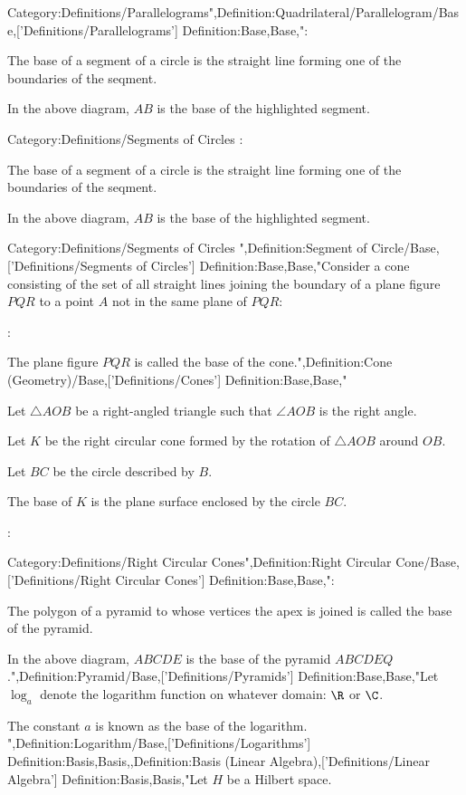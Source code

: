 Category:Definitions/Parallelograms",Definition:Quadrilateral/Parallelogram/Base,['Definitions/Parallelograms']
Definition:Base,Base,":

The base of a segment of a circle is the straight line forming one of the boundaries of the seqment.

In the above diagram, $AB$ is the base of the highlighted segment.


Category:Definitions/Segments of Circles
:

The base of a segment of a circle is the straight line forming one of the boundaries of the seqment.

In the above diagram, $AB$ is the base of the highlighted segment.


Category:Definitions/Segments of Circles
",Definition:Segment of Circle/Base,['Definitions/Segments of Circles']
Definition:Base,Base,"Consider a cone consisting of the set of all straight lines joining the boundary of a plane figure $PQR$ to a point $A$ not in the same plane of $PQR$:


:


The plane figure $PQR$ is called the base of the cone.",Definition:Cone (Geometry)/Base,['Definitions/Cones']
Definition:Base,Base,"

Let $\triangle AOB$ be a right-angled triangle such that $\angle AOB$ is the right angle.

Let $K$ be the right circular cone formed by the rotation of $\triangle AOB$ around $OB$.

Let $BC$ be the circle described by $B$.

The base of $K$ is the plane surface enclosed by the circle $BC$.



:



Category:Definitions/Right Circular Cones",Definition:Right Circular Cone/Base,['Definitions/Right Circular Cones']
Definition:Base,Base,":


The polygon of a pyramid to whose vertices the apex is joined is called the base of the pyramid.

In the above diagram, $ABCDE$ is the base of the pyramid $ABCDEQ$.",Definition:Pyramid/Base,['Definitions/Pyramids']
Definition:Base,Base,"Let $\log_a$ denote the logarithm function on whatever domain: $\R$ or $\C$.

The constant $a$ is known as the base of the logarithm.
",Definition:Logarithm/Base,['Definitions/Logarithms']
Definition:Basis,Basis,,Definition:Basis (Linear Algebra),['Definitions/Linear Algebra']
Definition:Basis,Basis,"Let $H$ be a Hilbert space.



